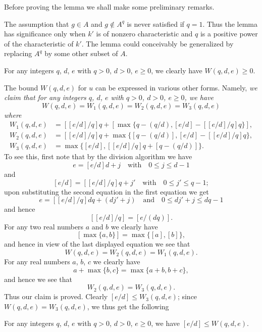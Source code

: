Before proving the lemma we shall make some preliminary remarks.

\begin{remark}\label{art01-rem1}
The assumption that $g\in A$ and $g\not\in A^{q}$ is never satisfied if $q=1$. Thus the lemma has significance only when $k'$ is of nonzero characteristic and $q$ is a positive power of the characteristic of $k'$. The lemma could conceivably be generalized by replacing $A^{q}$ by some other subset of $A$.
\end{remark}

\begin{remark}\label{art01-rem2}
For any integers $q$, $d$, $e$ with $q>0$, $d>0$, $e\geq 0$, we clearly have $W(q,d,e)\geq 0$.
\end{remark}

\begin{remark}\label{art01-rem3}
The bound $W(q,d,e)$ for $u$ can be expressed in various other forms. Namely, {\em we claim that for any integers $q$, $d$, $e$ with $q>0$, $d>0$, $e\geq 0$, we have}
$$
W(q,d,e)=W_{1}(q,d,e)=W_{2}(q,d,e)=W_{3}(q,d,e)
$$
{\em where}
\begin{align*}
W_{1}(q,d,e) &= [[e/d]/q]q+[\max\{q-(q/d),[e/d]-[[e/d]/q]q\}],\\
W_{2}(q,d,e) &= [[e/d]/q]q+\max \{[q-(q/d)],[e/d]-[[e/d]/q]q\},\\
W_{3}(q,d,e) &= \max \{[e/d],[[e/d]/q]q+[q-(q/d)]\}.
\end{align*}
To see this, first note that by the division algorithm we have
$$
e=[e/d]d+j\text{~~ with~~ } 0\leq j\leq d-1
$$
and
$$
[e/d]=[[e/d]/q]q+j'\text{~~ with~~ } 0\leq j'\leq q-1;
$$
upon substituting the second equation in the first equation we get 
$$
e=[[e/d]/q]dq+(dj'+j)\text{~~ and~~ } 0\leq dj'+j\leq dq-1
$$
and hence
$$
[[e/d]/q]=[e/(dq)].
$$\pageoriginale
For any two real numbers $a$ and $b$ we clearly have 
$$
[\max \{a,b\}]=\max \{[a],[b]\},
$$ 
and hence in view of the last displayed equation we see that
$$
W(q,d,e)=W_{2}(q,d,e)=W_{1}(q,d,e).
$$
For any real numbers $a$, $b$, $c$ we clearly have
$$
a+\max \{b,c\}=\max \{a+b,b+c\},
$$
and hence we see that
$$
W_{2}(q,d,e)=W_{3}(q,d,e).
$$
Thus our claim is proved. Clearly $[e/d]\leq W_{3}(q,d,e)$; since $W(q,d,e)=W_{3}(q,d,e)$, we thus get the following
\end{remark}

\begin{remark}\label{art01-rem4}
For any integers $q$, $d$, $e$ with $q>0$, $d>0$, $e\geq 0$, we have $[e/d]\leq W(q,d,e)$.
\end{remark}

